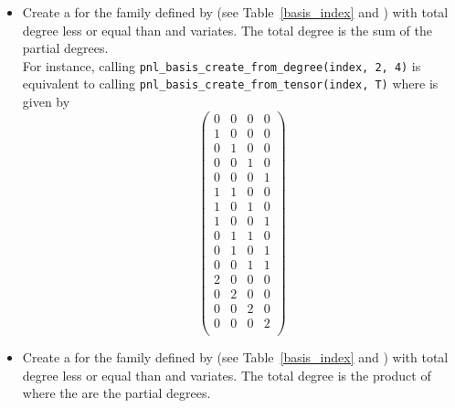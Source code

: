 \begin{itemize}
\item {}
  \sshortdescribe Create a \PnlBasis for the family
  defined by  (see Table~\ref{basis_index} and ) with total degree less
  or equal than  and  variates. The total degree is
  the sum of the partial degrees.\\
  For instance, calling \verb!pnl_basis_create_from_degree(index, 2, 4)! is
  equivalent to calling \verb!pnl_basis_create_from_tensor(index, T)! where
   is given by
  \[ \left(
    \begin{array}{cccc}
      0 & 0 & 0 & 0\\
      1 & 0 & 0 & 0\\
      0 & 1 & 0 & 0\\
      0 & 0 & 1 & 0\\
      0 & 0 & 0 & 1\\
      1 & 1 & 0 & 0\\
      1 & 0 & 1 & 0\\
      1 & 0 & 0 & 1\\
      0 & 1 & 1 & 0\\
      0 & 1 & 0 & 1\\
      0 & 0 & 1 & 1\\
      2 & 0 & 0 & 0\\
      0 & 2 & 0 & 0\\
      0 & 0 & 2 & 0\\
      0 & 0 & 0 & 2\\
    \end{array}
  \right) \]
\item {}
  \sshortdescribe Create a \PnlBasis for the family
  defined by  (see Table~\ref{basis_index} and ) with total degree less
  or equal than  and  variates. The total degree is
  the product of  where the  are the partial degrees.



\end{itemize}
